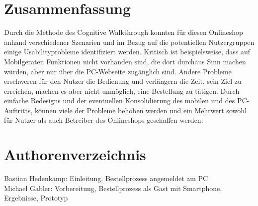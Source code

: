 \documentclass[	12pt, 
				a4paper, 
				BCOR=10mm, %
				DIV=12, 
				parskip=half, %
				headings=small, %
				twoside, %
				ngerman,
				bibliography=totoc,index=totoc, listof=totoc,
				numbers=noendperiod
				]{scrbook} %
\theoremstyle{plain}%
\theoremstyle{definition}
\theoremstyle{remark}
\begin{document}
\chapter{Zusammenfassung}
Durch die Methode des Cognitive Walkthrough konnten für diesen Onlineshop anhand verschiedener Szenarien und im Bezug auf die potentiellen Nutzergruppen einige Usabilityprobleme identifiziert werden. Kritisch ist beispielsweise, dass auf Mobilgeräten Funktionen nicht vorhanden sind, die dort durchaus Sinn machen würden, aber nur über die PC-Webseite zugänglich sind. Andere Probleme erschweren für den Nutzer die Bedienung und verlängern die Zeit, sein Ziel zu erreichen, machen es aber nicht unmöglich, eine Bestellung zu tätigen. Durch einfache Redesigns und der eventuellen Konsolidierung des mobilen und des PC-Auftritts, können viele der Probleme behoben werden und ein Mehrwert sowohl für Nutzer als auch Betreiber des Onlineshops geschaffen werden.


\newpage
 \printbibliography	%

\appendix 				%

\newpage
\chapter{Authorenverzeichnis}
Bastian Hedenkamp: Einleitung, Bestellprozess angemeldet am PC\\
Michael Gabler: Vorbereitung, Bestellprozess als Gast mit Smartphone, Ergebnisse, Prototyp 
\end{document}
